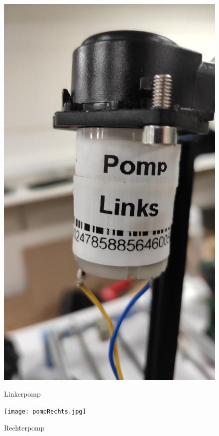 \documentclass[a4paper,twoside,kulak]{kulakreport} %
\begin{document}
\begin{figure}
	\centering
	\begin{minipage}{.5\textwidth}
		\centering
		\includegraphics[width=\linewidth, angle=270]{pompLinks.jpg}
		\caption{Linkerpomp}
		\label{fig: linkerpomp}
	\end{minipage}%
	\begin{minipage}{.5\textwidth}
		\centering
		\texttt{[image: pompRechts.jpg]}
		\caption{Rechterpomp}
		\label{fig: rechterpomp}
	\end{minipage}
\end{figure}
\end{document}
